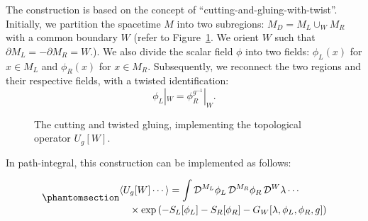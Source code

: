 \documentclass[
  letterpaper,
  DIV=11,
  numbers=noendperiod]{scrreport}
\newcommand{\stdim}{D}
\begin{document}
The construction is based on the concept of
``cutting-and-gluing-with-twist''. Initially, we partition the spacetime
\(M\) into two subregions: \(M_\stdim = M_L \cup_W M_R\) with a common
boundary \(W\) (refer to Figure~\ref{fig-cut-M}. We orient \(W\) such
that \(\partial M_L = -\partial M_R = W\).). We also divide the scalar
field \(\phi\) into two fields: \(\phi_L(x)\) for \(x \in M_L\) and
\(\phi_R(x)\) for \(x \in M_R\). Subsequently, we reconnect the two
regions and their respective fields, with a twisted identification:
\[ \phi_L|_W = \phi_R^{g^{-1}}|_W. \]

\begin{figure}[t]


\caption{\label{fig-cut-M}The cutting and twisted gluing, implementing
the topological operator \(U_g[W]\).}

\end{figure}%

In path-integral, this construction can be implemented as follows:

\begin{tcolorbox}[enhanced jigsaw, opacityback=0, opacitybacktitle=0.6, leftrule=.75mm, arc=.35mm, coltitle=black, breakable, colframe=quarto-callout-important-color-frame, titlerule=0mm, colback=white, bottomrule=.15mm, left=2mm, colbacktitle=quarto-callout-important-color!10!white, toptitle=1mm, bottomtitle=1mm, title=\textcolor{quarto-callout-important-color}{\faExclamation}\hspace{0.5em}{Symmetry Topological Operator for a Classical Symmetry}, rightrule=.15mm, toprule=.15mm]

\begin{equation}\phantomsection\label{eq-Ug-pathintegral}{
\begin{multlined}
    \langle U_g[W] \cdots \rangle = \int \mathop{\mathcal{D}^{M_L}\phi_L} \mathop{\mathcal{D}^{M_R}\phi_R} \mathop{\mathcal{D}^W\lambda} \cdots\\ \times \exp\left(-S_L[\phi_L]-S_R[\phi_R] - G_W[\lambda,\phi_L,\phi_R,g]\right)
\end{multlined}
}\end{equation}

\end{tcolorbox}
\end{document}
